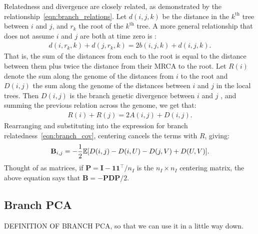 Relatedness and divergence are closely related,
as demonstrated by the relationship~\eqref{eqn:branch_relations}.
%
Let $d(i,j,k)$ be the distance in the $k^\text{th}$ tree between $i$ and $j$,
and $r_k$ the root of the $k^\text{th}$ tree.
%
A more general relationship that does not assume $i$ and $j$ are both at time zero is
\citep{semple2003phylogenetics}:
%
\begin{align}
    d(i,r_k,k) + d(j,r_k,k) = 2 b(i,j,k) + d(i,j,k) .
\end{align}
%
That is, the sum of the distances from each to the root is
equal to the distance between them plus twice the distance from their MRCA to the root.
%
Let $R(i)$ denote the sum along the genome of the distances from $i$ to the root and
$D(i,j)$ the sum along the genome of the distances between $i$ and $j$ in the local trees.
%
Then $D(i,j)$ is the branch genetic divergence between $i$ and $j$ \citep{ralph2020efficiently},
and summing the previous relation across the genome, we get that:
%
\begin{align} \label{eqn:divergence_relatedness}
    R(i) + R(j) = 2 A(i,j) + D(i,j) .
\end{align}
%
Rearranging and substituting into the expression for branch relatedness~\eqref{eqn:branch_cov},
centering cancels the terms with $R$, giving:
%
\begin{align}\label{eqn:divergence_relatedness_branch}
    \mathbf{B}_{i,j} = - \frac{1}{2} \mathbb{E}[D(i,j) - D(i,U) - D(j,V) + D(U,V)] .
\end{align}
%
Thought of as matrices, if $\mathbf{P}=\mathbf{I} - \mathbf{1}\mathbf{1}^\intercal / n_I$ is the $n_I \times n_I$
centering matrix, the above equation says that $\mathbf{B} = - \mathbf{P} \mathbf{D} \mathbf{P} / 2$.

\subsection{Branch PCA}
DEFINITION OF BRANCH PCA, so that we can use it in a little way down. 

